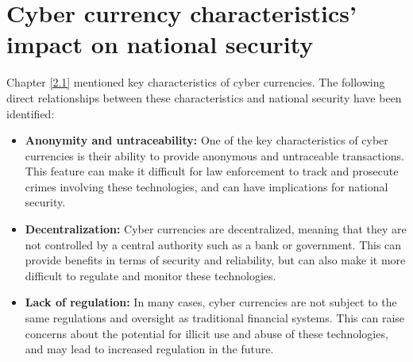 \chapter{Cyber currency characteristics' impact on national security}
Chapter \ref{2.1} mentioned key characteristics of cyber currencies. The following direct relationships between these characteristics and national security have been identified:

\begin{itemize}
    \item \textbf{Anonymity and untraceability:} One of the key characteristics of cyber currencies is their ability to provide anonymous and untraceable transactions. This feature can make it difficult for law enforcement to track and prosecute crimes involving these technologies, and can have implications for national security.
    \item \textbf{Decentralization:} Cyber currencies are decentralized, meaning that they are not controlled by a central authority such as a bank or government. This can provide benefits in terms of security and reliability, but can also make it more difficult to regulate and monitor these technologies.
    \item \textbf{Lack of regulation:} In many cases, cyber currencies are not subject to the same regulations and oversight as traditional financial systems. This can raise concerns about the potential for illicit use and abuse of these technologies, and may lead to increased regulation in the future.
\end{itemize}

    

   


